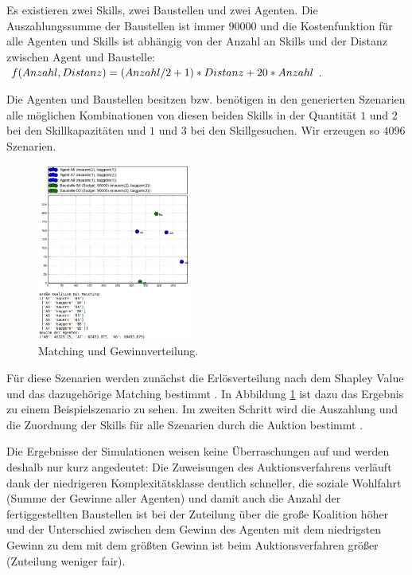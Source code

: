  Es existieren zwei Skills, zwei Baustellen und zwei Agenten. Die Auszahlungssumme der Baustellen ist immer $90000$ und die Kostenfunktion für alle Agenten und Skills ist abhängig von der Anzahl an Skills und der Distanz zwischen Agent und Baustelle: $f(Anzahl, \-Distanz)\- = (Anzahl/2+1)\-*Distanz\-+20*Anzahl$.

Die Agenten und Baustellen besitzen bzw. benötigen in den generierten Szenarien alle möglichen Kombinationen von diesen beiden Skills in der Quantität $1$ und $2$ bei den Skillkapazitäten und $1$ und $3$ bei den Skillgesuchen. Wir erzeugen so $4096$ Szenarien. 

\begin{figure}
  \centering
  \includegraphics[width=0.45\textwidth]{example-shapley-value.png}
  \caption{Matching und Gewinnverteilung.}
  \label{example-shapley-value}
\end{figure}

Für diese Szenarien werden zunächst die Erlösverteilung nach dem Shapley Value und das dazugehörige Matching bestimmt \cite{gitShapley}. In Abbildung \ref{example-shapley-value} ist dazu das Ergebnis zu einem Beispielszenario zu sehen. Im zweiten Schritt wird die Auszahlung und die Zuordnung der Skills für alle Szenarien durch die Auktion bestimmt \cite{gitAuction}.

Die Ergebnisse der Simulationen weisen keine Überraschungen auf und werden deshalb nur kurz angedeutet: Die Zuweisungen des Auktionsverfahrens verläuft dank der niedrigeren Komplexitätsklasse deutlich schneller, die soziale Wohlfahrt (Summe der Gewinne aller Agenten) und damit auch die Anzahl der fertiggestellten Baustellen ist bei der Zuteilung über die große Koalition höher und der Unterschied zwischen dem Gewinn des Agenten mit dem niedrigsten Gewinn zu dem mit dem größten Gewinn ist beim Auktionsverfahren größer (Zuteilung weniger fair).

